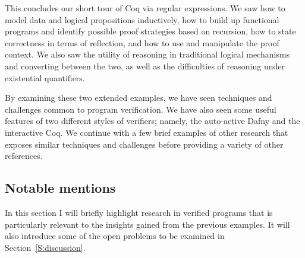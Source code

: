 This concludes our short tour of Coq via regular expressions. We saw how to
model data and logical propositions inductively, how to build up functional
programs and identify possible proof strategies based on recursion, how to state
correctness in terms of reflection, and how to use and manipulate the proof
context. We also saw the utility of reasoning in traditional logical mechanisms
and converting between the two, as well as the difficulties of reasoning under
existential quantifiers.

By examining these two extended examples, we have seen techniques and challenges
common to program verification. We have also seen some useful features of two
different styles of verifiers; namely, the auto-active Dafny and the interactive
Coq. We continue with a few brief examples of other research that exposes
similar techniques and challenges before providing a variety of other
references.

\subsection{Notable mentions}\label{S:ex_notable}

In this section I will briefly highlight research in verified programs that is
particularly relevant to the insights gained from the previous examples. It will
also introduce some of the open problems to be examined in
Section~\ref{S:discussion}.

